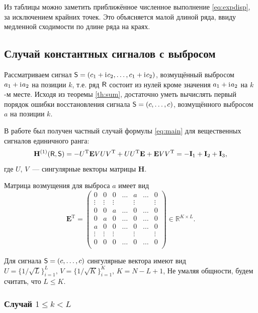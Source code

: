 \documentclass[specialist,
               substylefile = spbu.rtx,
               subf,href,colorlinks=true, 12pt]{disser}
\begin{document}
Из таблицы можно заметить приближённое численное выполнение \eqref{eq:expdisp}, за исключением крайних точек. Это объясняется малой длиной ряда, ввиду медленной сходимости по длине ряда на краях.

\subsection{Случай константных сигналов с выбросом}
Рассматриваем сигнал $\textsf{S} = (c_1 + \mathrm{i}\mkern1mu c_2, \ldots, c_1 + \mathrm{i}\mkern1mu c_2)$, возмущённый выбросом $a_1 + \mathrm{i}\mkern1mu a_2$ на позиции $k$, т.е. ряд $\textsf{R}$ состоит из нулей кроме значения $a_1 + \mathrm{i}\mkern1mu a_2$ на $k$-м месте. Исходя из теоремы \ref{th:sum}, достаточно уметь вычислять первый порядок ошибки восстановления сигнала $\textsf{S} = (c, \ldots, c)$, возмущённого выбросом $a$ на позиции $k$.

В работе \cite{Nekr2008} был получен частный случай формулы \eqref{eq:main} для вещественных сигналов единичного ранга:
\begin{equation} \label{eq:real_rk1}
\mathbf{H}^{(1)}(\textsf{R}, \textsf{S}) = -U^{\mathrm{T}} \mathbf{E} V U V^{\mathrm{T}} + U U^{\mathrm{T}} \mathbf{E} + \mathbf{E} V V^{\mathrm{T}} = -\mathbf{I}_1 + \mathbf{I}_2 + \mathbf{I}_3,
\end{equation}
где $U$, $V$~--- сингулярные векторы матрицы $\mathbf{H}$.

Матрица возмущения для выброса $a$ имеет вид
$$\mathbf{E}^{\mathrm{T}} = \begin{pmatrix}
	0 & 0 & 0 & \ldots &  a  & \ldots & 0\\
	 \vdots &\vdots & \vdots & &  \vdots & & \vdots\\
	0 & 0 & a & \ldots & 0 & \ldots & 0\\
	0 & a & 0 & \ldots & 0 & \ldots & 0\\
	a & 0 & 0 & \ldots & 0 & \ldots & 0\\
	\vdots &\vdots & \vdots & & \vdots & & \vdots\\
	0 & 0 & 0 & \ldots & 0 & \ldots & 0\\
\end{pmatrix} \in \mathbb{R}^{K \times L}.$$

Для сигнала $\textsf{S} = (c, \ldots, c)$ сингулярные вектора имеют вид
$U = \{1/\sqrt{L}\}^{L}_{i = 1},\, V = \{1/\sqrt{K}\}^{K}_{i = 1}$, $K = N - L + 1$,
Не умаляя общности, будем считать, что $L \leq K$.

\subsubsection{Случай $1 \leq k < L$}
\end{document}
